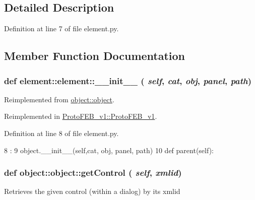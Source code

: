 \subsection{Detailed Description}


Definition at line 7 of file element.py.

\subsection{Member Function Documentation}
\hypertarget{classelement_1_1element_a7c08cd9a50e415b05efacce60b4511d2}{
\subsubsection[{\_\-\_\-init\_\-\_\-}]{\setlength{\rightskip}{0pt plus 5cm}def element::element::\_\-\_\-init\_\-\_\- ( {\em self}, \/   {\em cat}, \/   {\em obj}, \/   {\em panel}, \/   {\em path})}}
\label{classelement_1_1element_a7c08cd9a50e415b05efacce60b4511d2}


Reimplemented from \hyperlink{classobject_1_1object_a1220f7c88ee9a71fcfd9acb49a2f44d8}{object::object}.

Reimplemented in \hyperlink{classProtoFEB__v1_1_1ProtoFEB__v1_a4fe76cce14ea6f67a0b32d45a92ab577}{ProtoFEB\_\-v1::ProtoFEB\_\-v1}.

Definition at line 8 of file element.py.


\begin{DoxyCode}
8                                              :
9         object.__init__(self,cat, obj, panel, path)
10 
    def parent(self):
\end{DoxyCode}
\hypertarget{classobject_1_1object_ac765747a2b581d48eeb94e600c31fc3f}{
\subsubsection[{getControl}]{\setlength{\rightskip}{0pt plus 5cm}def object::object::getControl ( {\em self}, \/   {\em xmlid})}}
\label{classobject_1_1object_ac765747a2b581d48eeb94e600c31fc3f}
\begin{DoxyVerb}Retrieves the given control (within a dialog) by its xmlid\end{DoxyVerb}
 

